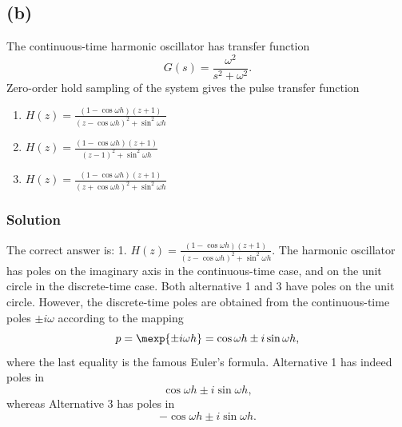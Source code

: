 \documentclass[a4paper]{scrartcl}
\begin{document}
\subsection*{(b)}
\label{sec-2-2}
The continuous-time harmonic oscillator has transfer function
\[ G(s) = \frac{\omega^2}{s^2 + \omega^2}. \]
Zero-order hold sampling of the system gives the pulse transfer function
\begin{enumerate}
\item \( H(z) = \frac{(1-\cos\omega h)(z+1)}{(z-\cos \omega h)^2 + \sin^2 \omega h} \)
\item \( H(z) = \frac{(1-\cos\omega h)(z+1)}{(z-1)^2 + \sin^2 \omega h} \)
\item \( H(z) = \frac{(1-\cos\omega h)(z+1)}{(z+\cos \omega h)^2 + \sin^2 \omega h} \)
\end{enumerate}

\subsubsection*{Solution}
\label{sec-2-2-1}
The correct answer is: 1. \( H(z) = \frac{(1-\cos\omega h)(z+1)}{(z-\cos \omega h)^2 + \sin^2 \omega h}. \)
The harmonic oscillator has poles on the imaginary axis in the continuous-time case, and on the unit circle in the discrete-time case. Both alternative 1 and 3 have poles on the unit circle. However, the discrete-time poles are obtained from the continuous-time poles $\pm i\omega$ according to the mapping
\[ p = \mexp{\pm i\omega h} = \cos\omega h \pm i\sin\omega h, \]
where the last equality is the famous Euler's formula. Alternative 1 has indeed poles in 
\[ \cos\omega h \pm i \sin\omega h, \]
whereas Alternative 3 has poles in 
\[ -\cos\omega h \pm i \sin\omega h. \]
\end{document}
